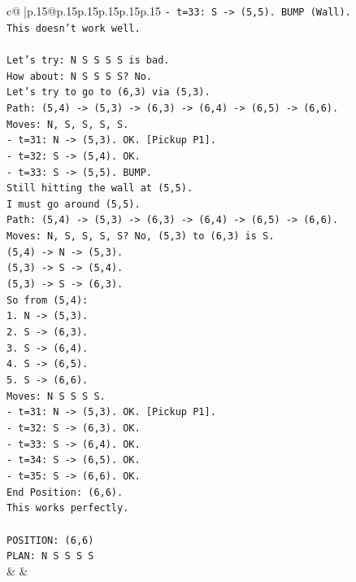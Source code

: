 \documentclass{article}
\begin{document}
{\begin{supertabular}{c@{$\;$}|p{.15\linewidth}@{}p{.15\linewidth}p{.15\linewidth}p{.15\linewidth}p{.15\linewidth}p{.15\linewidth}}
{{{\texttt{{-} t=33: S {-}> (5,5). BUMP (Wall).} \\
\texttt{This doesn't work well.} \\
\\ 
\texttt{Let's try: N S S S S is bad.} \\
\texttt{How about: N S S S S? No.} \\
\texttt{Let's try to go to (6,3) via (5,3).} \\
\texttt{Path: (5,4) {-}> (5,3) {-}> (6,3) {-}> (6,4) {-}> (6,5) {-}> (6,6).} \\
\texttt{Moves: N, S, S, S, S.} \\
\texttt{{-} t=31: N {-}> (5,3). OK. {[}Pickup P1{]}.} \\
\texttt{{-} t=32: S {-}> (5,4). OK.} \\
\texttt{{-} t=33: S {-}> (5,5). BUMP.} \\
\texttt{Still hitting the wall at (5,5).} \\
\texttt{I must go around (5,5).} \\
\texttt{Path: (5,4) {-}> (5,3) {-}> (6,3) {-}> (6,4) {-}> (6,5) {-}> (6,6).} \\
\texttt{Moves: N, S, S, S, S? No, (5,3) to (6,3) is S.} \\
\texttt{(5,4) {-}> N {-}> (5,3).} \\
\texttt{(5,3) {-}> S {-}> (5,4).} \\
\texttt{(5,3) {-}> S {-}> (6,3).} \\
\texttt{So from (5,4):} \\
\texttt{1. N {-}> (5,3).} \\
\texttt{2. S {-}> (6,3).} \\
\texttt{3. S {-}> (6,4).} \\
\texttt{4. S {-}> (6,5).} \\
\texttt{5. S {-}> (6,6).} \\
\texttt{Moves: N S S S S.} \\
\texttt{{-} t=31: N {-}> (5,3). OK. {[}Pickup P1{]}.} \\
\texttt{{-} t=32: S {-}> (6,3). OK.} \\
\texttt{{-} t=33: S {-}> (6,4). OK.} \\
\texttt{{-} t=34: S {-}> (6,5). OK.} \\
\texttt{{-} t=35: S {-}> (6,6). OK.} \\
\texttt{End Position: (6,6).} \\
\texttt{This works perfectly.} \\
\\ 
\texttt{POSITION: (6,6)} \\
\texttt{PLAN: N S S S S} \\
            }
        }
    }
    & & \\ \\


\end{supertabular}}
\end{document}
